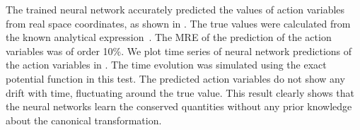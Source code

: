 The trained neural network accurately predicted the values of action variables from real space coordinates, as shown in .
The true values were calculated from the known analytical expression~\cite{Flaschka-McLaughlin1976,Flaschka1974}.
The MRE of the prediction of the action variables was of order 10\%.
We plot time series of neural network predictions of the action variables in .
The time evolution was simulated using the exact potential function in this test.
The predicted action variables do not show any drift with time, fluctuating around the true value.
This result clearly shows that the neural networks learn the conserved quantities without any prior knowledge about the canonical transformation.
